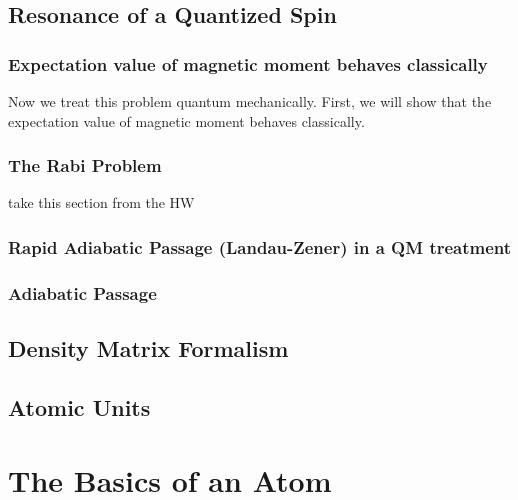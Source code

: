 \documentclass{book}
\theoremstyle{definition}
\begin{document}
\section{Resonance of a Quantized Spin}




\subsection{Expectation value of magnetic moment behaves classically}


Now we treat this problem quantum mechanically. First, we will show that the expectation value of magnetic moment behaves classically. 



\subsection{The Rabi Problem}

take this section from the HW


\subsection{Rapid Adiabatic Passage (Landau-Zener) in a QM treatment}


\subsection{Adiabatic Passage}



\section{Density Matrix Formalism}











\section{Atomic Units}







\chapter{The Basics of an Atom}
\end{document}
